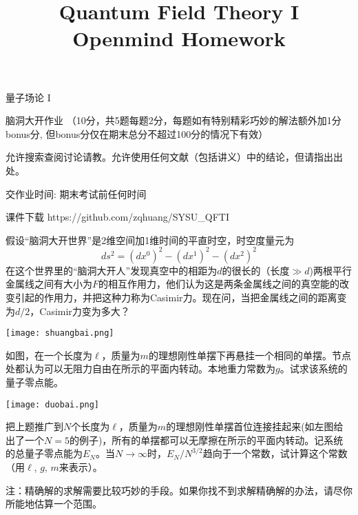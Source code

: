 \documentclass[CJK]{beamer}
\title{Quantum Field Theory I \\ Openmind Homework}
\author{}
\date{}
\begin{document}
\begin{frame}
 
\begin{center}
\begin{Large}
\bch
量子场论 I 

{\vskip 0.3in}

脑洞大开作业 （10分，共5题每题2分，每题如有特别精彩巧妙的解法额外加1分bonus分, 但bonus分仅在期末总分不超过100分的情况下有效）

\skipline
允许搜索查阅讨论请教。允许使用任何文献（包括讲义）中的结论，但请指出出处。

\skipline
交作业时间: 期末考试前任何时间

\ech
\end{Large}
\end{center}

\vskip 0.2in

\bch
课件下载
\ech
https://github.com/zqhuang/SYSU\_QFTI

\end{frame}


\begin{frame}
\bch
假设“脑洞大开世界”是2维空间加1维时间的平直时空，时空度量元为
$$ds^2 = (dx^0)^2 - (dx^1)^2-(dx^2)^2$$
在这个世界里的“脑洞大开人”发现真空中的相距为$d$的很长的（长度$\gg d$)两根平行金属线之间有大小为$F$的相互作用力，他们认为这是两条金属线之间的真空能的改变引起的作用力，并把这种力称为Casimir力。现在问，当把金属线之间的距离变为$d/2$，Casimir力变为多大？

\ech
\end{frame}

\begin{frame}
\bch
\begin{minipage}{0.3\textwidth}
\texttt{[image: shuangbai.png]}
\end{minipage}
\begin{minipage}{0.5\textwidth}
如图，在一个长度为$\ell$，质量为$m$的理想刚性单摆下再悬挂一个相同的单摆。节点处都认为可以无阻力自由在所示的平面内转动。本地重力常数为$g$。试求该系统的量子零点能。

\end{minipage}
\ech
\end{frame}

\begin{frame}
\bch
\begin{minipage}{0.3\textwidth}
\texttt{[image: duobai.png]}
\end{minipage}
\begin{minipage}{0.5\textwidth}
把上题推广到$N$个长度为$\ell$，质量为$m$的理想刚性单摆首位连接挂起来(如左图给出了一个$N=5$的例子)，所有的单摆都可以无摩擦在所示的平面内转动。记系统的总量子零点能为$E_N$。当$N\rightarrow \infty$时，$E_N/N^{3/2}$趋向于一个常数，试计算这个常数（用$\ell$, $g$, $m$来表示）。

\skipline
{\scriptsize 
注：精确解的求解需要比较巧妙的手段。如果你找不到求解精确解的办法，请尽你所能地估算一个范围。
}
\end{minipage}

\ech
\end{frame}
\end{document}
